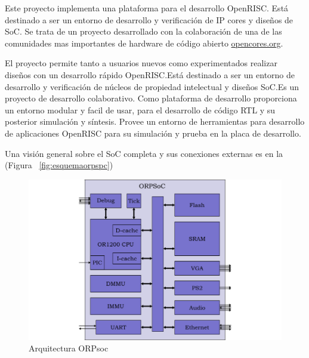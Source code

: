 Este proyecto implementa una plataforma para el desarrollo OpenRISC. Está destinado a ser un entorno de desarrollo y verificación de IP cores y diseños de SoC. Se trata de un proyecto desarrollado con la colaboración de una de las comunidades mas importantes de hardware de código abierto \url{opencores.org}.

El proyecto permite tanto a usuarios nuevos como experimentados realizar diseños con un desarrollo rápido OpenRISC.Está destinado a ser un entorno de desarrollo y verificación de núcleos de propiedad intelectual y diseños SoC.Es un proyecto de desarrollo colaborativo. Como plataforma de desarrollo proporciona un entorno modular y facil de usar, para el desarrollo de código RTL y su posterior simulación y síntesis. Provee un entorno de herramientas para desarrollo de aplicaciones OpenRISC para su simulación y prueba en la placa de desarrollo.

Una visión general sobre el SoC completa y sus conexiones externas es en la  (Figura ~\ref{fig:esquemaorpspc})

\begin{figure}[h!]
 \begin{center}
  \includegraphics[width=1\textwidth,keepaspectratio=true]{./images/orpsoc}
  \caption{Arquitectura ORPsoc}
  \label{fig:esquemaorpsoc}
 \end{center}
\end{figure}

